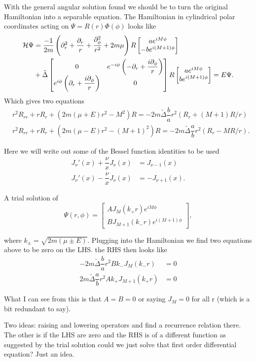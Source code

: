 With the general angular solution found we should be to turn the original Hamiltonian into a separable equation. 
The Hamiltonian in cylindrical polar coordinates acting on $\Psi = R(r)\Phi(\phi)$ looks like
\begin{align*}
  \mathcal{H}\Psi &= \dfrac{-1}{2m}\left(\partial_r^2 + \dfrac{\partial_r}{r} + \dfrac{\partial_{\phi}^2}{r^2} + 2m\mu\right) R
  \begin{bmatrix}
    ae^{iM\phi} \\
    -be^{i(M+1)\phi}
  \end{bmatrix} \\
  &+\tilde{\Delta}
  \begin{bmatrix}
    0 & e^{-i\phi}\left(-\partial_r + \dfrac{i\partial_{\phi}}{r}\right) \\
    e^{i\phi}\left(\partial_r + \dfrac{i\partial_{\phi}}{r}\right) & 0
  \end{bmatrix} R
  \begin{bmatrix}
    ae^{iM\phi} \\
    be^{i(M+1)\phi}
  \end{bmatrix}  = E\Psi.
\end{align*}
Which gives two equations
\begin{align}
  &r^2R_{rr} + rR_r + (2m(\mu+E) r^2-M^2)R = -2m\tilde{\Delta}\dfrac{b}{a}r^2(R_r + (M+1)R/r) \\
  &r^2R_{rr} + rR_r + (2m(\mu-E) r^2-(M+1)^2)R = -2m\tilde{\Delta}\dfrac{a}{b}r^2(R_r - MR/r).
\end{align}

Here we will write out some of the Bessel function identities to be used
\begin{align*}
  J_{\nu}'(x) + \dfrac{\nu}{x}J_{\nu}(x) &= J_{\nu-1}(x) \\
  J_{\nu}'(x) - \dfrac{\nu}{x}J_{\nu}(x) &= - J_{\nu+1}(x).
\end{align*}

A trial solution of
\begin{equation}
  \Psi(r,\phi) = 
  \begin{bmatrix}
    A J_M(k_+ r) e^{iM\phi} \\
    B J_{M+1}(k_- r) e^{i(M+1)\phi}
  \end{bmatrix},
\end{equation}

where $k_{\pm} = \sqrt{2m(\mu\pm E)}$.
Plugging into the Hamiltonian we find two equations above to be zero on the LHS. the RHS then looks like
\begin{align*}
  -2m\tilde\Delta\dfrac{b}{a}r^2 B k_- J_M(k_-r) &= 0 \\
  2m\tilde\Delta\dfrac{a}{b}r^2 A k_+ J_{M+1}(k_+r) &= 0
\end{align*}

What I can see from this is that $A=B=0$ or saying $J_M = 0$ for all r (which is a bit redundant to say).

Two ideas: raising and lowering operators and find a recurrence relation there. The other is if the LHS are zero and the RHS is of a different function as suggested by the trial solution could we just solve that first order differential equation? Just an idea.
